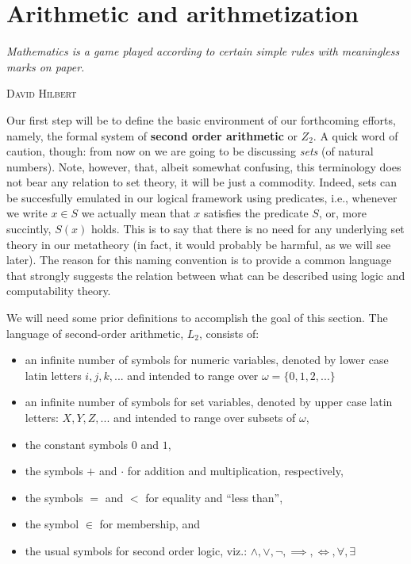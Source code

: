 \documentclass[../main.tex]{memoir}
\begin{document}
\chapter{Arithmetic and arithmetization}

\epigraph{
  \textit{
    Mathematics is a game played according to certain simple rules
    with meaningless marks on paper.
  }
}{\textsc{David Hilbert}}

Our first step will be to define the basic environment of our forthcoming efforts, namely, the formal system of \textbf{second order arithmetic} or $Z_2$. A quick word of caution, though: from now on we are going to be discussing \textit{sets} (of natural numbers). Note, however, that, albeit somewhat confusing, this terminology does not bear any relation to set theory, it will be just a commodity. Indeed, sets can be succesfully emulated in our logical framework using predicates, i.e., whenever we write $x \in S$ we actually mean that $x$ satisfies the predicate $S$, or, more succintly, $S(x)$ holds. This is to say that there is no need for any underlying set theory in our metatheory (in fact, it would probably be harmful, as we will see later). The reason for this naming convention is to provide a common language that strongly suggests the relation between what can be described using logic and computability theory.

We will need some prior definitions to accomplish the goal of this section. The language of second-order arithmetic, $L_2$, consists of:

\begin{itemize}
    \item an infinite number of symbols for numeric variables, denoted by lower case latin letters $i, j, k, ...$ and intended to range over $\omega = \{0, 1, 2, ...\}$
    \item an infinite number of symbols for set variables, denoted by upper case latin letters: $X, Y, Z, ...$ and intended to range over subsets of $\omega$,
    \item the constant symbols $0$ and $1$,
    \item the symbols $+$ and $\cdot$ for addition and multiplication, respectively,
    \item the symbols $=$ and $<$ for equality and ``less than'',
    \item the symbol $\in$ for membership, and
    \item the usual symbols for second order logic, viz.: $\land, \lor, \neg, \implies, \iff, \forall, \exists$
\end{itemize}
\end{document}
